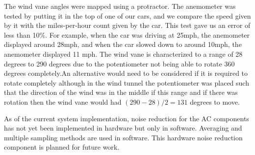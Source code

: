 	The wind vane angles were mapped using a protractor. The anemometer was tested by putting it in the top of one of our cars, and we compare the speed given by it with the miles-per-hour count given by the car. This test gave us an error of less than 10\%. For example, when the car was driving at 25mph, the anemometer displayed around 28mph, and when the car slowed down to around 10mph, the anemometer displayed 11 mph.
	The wind vane is characterized to a range of 28 degrees to 290 degrees due to the potentiometer not being able to rotate 360 degrees completely.An alternative would need to be considered if it is required to rotate completely although in the wind tunnel the potentiometer was placed such that the direction of the wind was in the middle if this range and if there was rotation then the wind vane would had $(290-28)/2 = 131$ degrees to move. 

	As of the current system implementation, noise reduction for the AC components has not yet been implemented in hardware but only in software. Averaging and multiple sampling methods are used in software. This hardware noise reduction component is planned for future work.


	